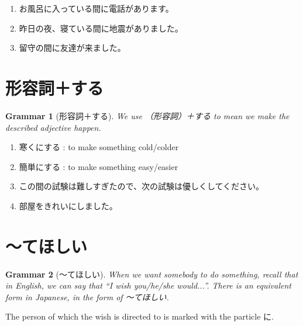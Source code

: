 \documentclass[notoc,notitlepage]{tufte-book}
\newtheorem{grammar}{\faBook Grammar}
\begin{document}
\begin{eg}
  \begin{enumerate}
    \item お風呂に入っている間に電話があります。
    \item 昨日の夜、寝ている間に地震がありました。
    \item 留守の間に友達が来ました。
  \end{enumerate}
\end{eg}


\section{形容詞＋する}%
\label{sec:keiyoushi_suru}

\begin{grammar}[形容詞＋する]\label{grammar:keiyoushi_suru}
  We use （形容詞）＋する to mean we make the described adjective happen.
\end{grammar}

\begin{eg}
  \begin{enumerate}
    \item 寒くにする : to make something cold/colder
    \item 簡単にする : to make something easy/easier
    \item この間の試験は難しすぎたので、次の試験は優しくしてください。
    \item 部屋をきれいにしました。
  \end{enumerate}
\end{eg}


\section{〜てほしい}%
\label{sec:tehoshii}

\begin{grammar}[〜てほしい]\label{grammar:_tehoshii}
  When we want somebody to do something, recall that in English,
  we can say that ``I wish you/he/she would...''.
  There is an equivalent form in Japanese, in the form of 〜てほしい.
\end{grammar}

\begin{note}
  The person of which the wish is directed to is marked with the particle
  に.
\end{note}
\end{document}
